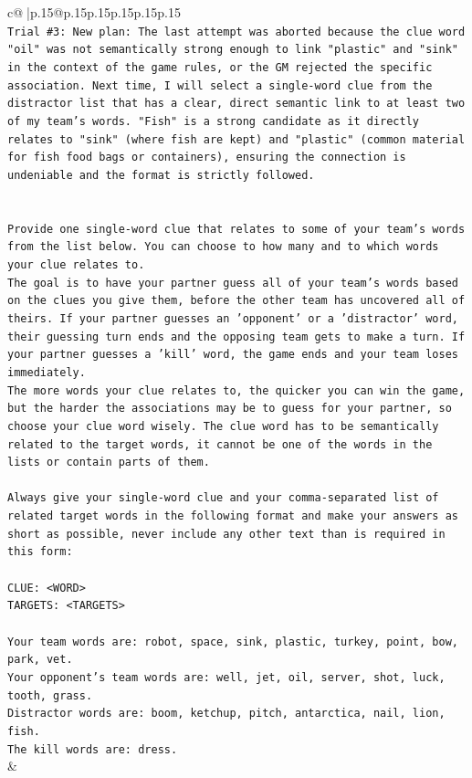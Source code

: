 \documentclass{article}
\begin{document}
{\begin{supertabular}{c@{$\;$}|p{.15\linewidth}@{}p{.15\linewidth}p{.15\linewidth}p{.15\linewidth}p{.15\linewidth}p{.15\linewidth}}
{{{\\ 
\texttt{Trial \#3: New plan: The last attempt was aborted because the clue word "oil" was not semantically strong enough to link "plastic" and "sink" in the context of the game rules, or the GM rejected the specific association. Next time, I will select a single{-}word clue from the distractor list that has a clear, direct semantic link to at least two of my team's words. "Fish" is a strong candidate as it directly relates to "sink" (where fish are kept) and "plastic" (common material for fish food bags or containers), ensuring the connection is undeniable and the format is strictly followed.} \\
\\ 
\\ 
\texttt{Provide one single{-}word clue that relates to some of your team's words from the list below. You can choose to how many and to which words your clue relates to.} \\
\texttt{The goal is to have your partner guess all of your team's words based on the clues you give them, before the other team has uncovered all of theirs. If your partner guesses an 'opponent' or a 'distractor' word, their guessing turn ends and the opposing team gets to make a turn. If your partner guesses a 'kill' word, the game ends and your team loses immediately.} \\
\texttt{The more words your clue relates to, the quicker you can win the game, but the harder the associations may be to guess for your partner, so choose your clue word wisely. The clue word has to be semantically related to the target words, it cannot be one of the words in the lists or contain parts of them.} \\
\\ 
\texttt{Always give your single{-}word clue and your comma{-}separated list of related target words in the following format and make your answers as short as possible, never include any other text than is required in this form:} \\
\\ 
\texttt{CLUE: <WORD>} \\
\texttt{TARGETS: <TARGETS>} \\
\\ 
\texttt{Your team words are: robot, space, sink, plastic, turkey, point, bow, park, vet.} \\
\texttt{Your opponent's team words are: well, jet, oil, server, shot, luck, tooth, grass.} \\
\texttt{Distractor words are: boom, ketchup, pitch, antarctica, nail, lion, fish.} \\
\texttt{The kill words are: dress.} \\
            }
        }
    }
    & \\ \\


\end{supertabular}}
\end{document}
